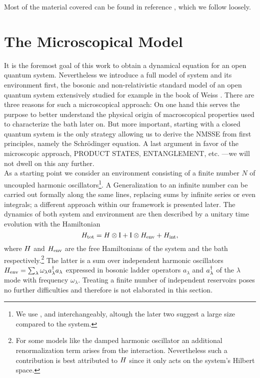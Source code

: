 Most of the material covered can be found in reference \cite{St01_habil}, which we follow loosely.


\section{The Microscopical Model}
\label{sec:nmqsd.model}
%
%

It is the foremost goal of this work to obtain a dynamical equation for an open quantum system.
Nevertheless we introduce a full model of system and its environment first, the bosonic and non-relativistic standard model of an open quantum system extensively studied for example in the book of Weiss \cite{We99_dissipative_systems}.
There are three reasons for such a microscopical approach:
On one hand this serves the purpose to better understand the physical origin of macroscopical properties used to characterize the bath later on.
But more important, starting with a closed quantum system is the only strategy allowing us to derive the NMSSE from first principles, namely the Schrödinger equation.
A last argument in favor of the microscopic approach, PRODUCT STATES, ENTANGLEMENT, etc. ---we will not dwell on this any further.\\


As a starting point we consider an environment consisting of a finite number $N$ of uncoupled harmonic oscillators\footnote{%
  We use ,  and  interchangeably, altough the later two suggest a large size compared to the system.
}.
A Generalization to an infinite number can be carried out formally along the same lines, replacing sums by infinite series or even integrals; a different approach within our framework is presented later.
The dynamics of both system and environment are then described by a unitary time evolution with the Hamiltonian
\begin{equation}
  H_\mathrm{tot} = H \otimes \mathrm{I}  +  \mathrm{I} \otimes H_\mathrm{env}  +  H_\mathrm{int},
  \label{eq:nmqsd.Htot}
\end{equation}
where $H$ and $H_\mathrm{env}$ are the free Hamiltonians of the system and the bath respectively.\footnote{%
  For some models like the damped harmonic oscillator \cite{CaLe83_diss_system} an additional renormalization term arises from the interaction.
  Nevertheless such a contribution is best attributed to $H$ since it only acts on the system's Hilbert space.
}
The latter is a sum over independent harmonic oscillators $H_\mathrm{env} = \sum_\lambda \omega_\lambda a^\dagger_\lambda a_\lambda$ expressed in bosonic ladder operators $a_\lambda$ and $a^\dagger_\lambda$ of the $\lambda$\th mode with frequency $\omega_\lambda$.
Treating a finite number of independent reservoirs poses no further difficulties and therefore is not elaborated in this section.

